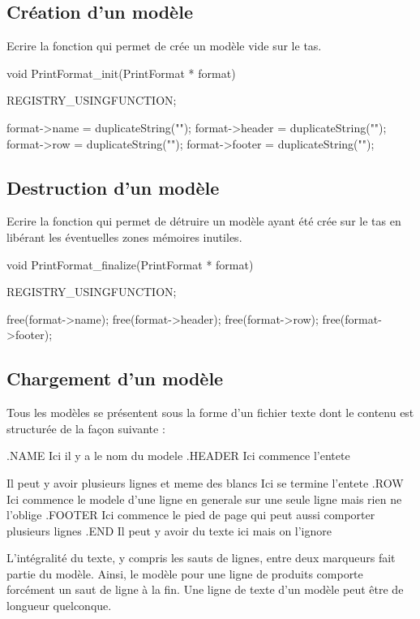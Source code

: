 \subsection{Création d'un modèle}

Ecrire la fonction  qui permet de crée un modèle vide sur le tas.

\begin{csourcecorrection}
void PrintFormat_init(PrintFormat * format) {
    REGISTRY_USINGFUNCTION;

    format->name = duplicateString("");
    format->header = duplicateString("");
    format->row = duplicateString("");
    format->footer = duplicateString("");
}
\end{csourcecorrection}

\subsection{Destruction d'un modèle}

Ecrire la fonction  qui permet de détruire un modèle ayant été crée sur le tas en libérant les éventuelles zones mémoires inutiles.

\begin{csourcecorrection}
void PrintFormat_finalize(PrintFormat * format) {
    REGISTRY_USINGFUNCTION;

    free(format->name);
    free(format->header);
    free(format->row);
    free(format->footer);
}
\end{csourcecorrection}

\subsection{Chargement d'un modèle}

Tous les modèles se présentent sous la forme d'un fichier texte dont le contenu est structurée de la façon suivante :
\begin{csource}
.NAME Ici il y a le nom du modele
.HEADER
Ici commence l'entete

Il peut y avoir plusieurs lignes
     et meme des blancs
Ici se termine l'entete
.ROW
Ici commence le modele d'une ligne en generale sur une seule ligne
mais rien ne l'oblige
.FOOTER
Ici commence le pied de page
qui peut aussi comporter plusieurs lignes
.END
Il peut y avoir du texte ici mais on l'ignore
\end{csource}
L'intégralité du texte, y compris les sauts de lignes, entre deux marqueurs fait partie du modèle. Ainsi, le modèle pour une ligne de produits comporte forcément un saut de ligne à la fin. Une ligne de texte d'un modèle peut être de longueur quelconque.

